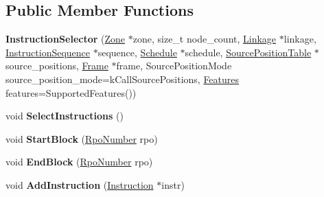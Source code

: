 \subsection*{Public Member Functions}
\begin{DoxyCompactItemize}
\item 
{\bfseries Instruction\+Selector} (\hyperlink{classv8_1_1internal_1_1_zone}{Zone} $\ast$zone, size\+\_\+t node\+\_\+count, \hyperlink{classv8_1_1internal_1_1compiler_1_1_linkage}{Linkage} $\ast$linkage, \hyperlink{classv8_1_1internal_1_1compiler_1_1_instruction_sequence}{Instruction\+Sequence} $\ast$sequence, \hyperlink{classv8_1_1internal_1_1compiler_1_1_schedule}{Schedule} $\ast$schedule, \hyperlink{classv8_1_1internal_1_1compiler_1_1_source_position_table}{Source\+Position\+Table} $\ast$source\+\_\+positions, \hyperlink{classv8_1_1internal_1_1compiler_1_1_frame}{Frame} $\ast$frame, Source\+Position\+Mode source\+\_\+position\+\_\+mode=k\+Call\+Source\+Positions, \hyperlink{classv8_1_1internal_1_1compiler_1_1_instruction_selector_1_1_features}{Features} features=Supported\+Features())\hypertarget{classv8_1_1internal_1_1compiler_1_1_instruction_selector_a245da9855d909fd1bdd8ec43f30fcf90}{}\label{classv8_1_1internal_1_1compiler_1_1_instruction_selector_a245da9855d909fd1bdd8ec43f30fcf90}

\item 
void {\bfseries Select\+Instructions} ()\hypertarget{classv8_1_1internal_1_1compiler_1_1_instruction_selector_a2181d8383b37cda1a330466c99db0126}{}\label{classv8_1_1internal_1_1compiler_1_1_instruction_selector_a2181d8383b37cda1a330466c99db0126}

\item 
void {\bfseries Start\+Block} (\hyperlink{classv8_1_1internal_1_1compiler_1_1_rpo_number}{Rpo\+Number} rpo)\hypertarget{classv8_1_1internal_1_1compiler_1_1_instruction_selector_ada7a5433d9707b2ff3be4aee76a9fe59}{}\label{classv8_1_1internal_1_1compiler_1_1_instruction_selector_ada7a5433d9707b2ff3be4aee76a9fe59}

\item 
void {\bfseries End\+Block} (\hyperlink{classv8_1_1internal_1_1compiler_1_1_rpo_number}{Rpo\+Number} rpo)\hypertarget{classv8_1_1internal_1_1compiler_1_1_instruction_selector_a796aed36b8e487591505c17a82339581}{}\label{classv8_1_1internal_1_1compiler_1_1_instruction_selector_a796aed36b8e487591505c17a82339581}

\item 
void {\bfseries Add\+Instruction} (\hyperlink{classv8_1_1internal_1_1compiler_1_1_instruction}{Instruction} $\ast$instr)\hypertarget{classv8_1_1internal_1_1compiler_1_1_instruction_selector_abe4f7e175a813cb3821cbcc4c4527503}{}\label{classv8_1_1internal_1_1compiler_1_1_instruction_selector_abe4f7e175a813cb3821cbcc4c4527503}


\end{DoxyCompactItemize}
